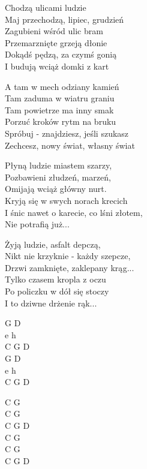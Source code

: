 
\begin{text}
    Chodzą ulicami ludzie\\
    Maj przechodzą, lipiec, grudzień\\
    Zagubieni wśród ulic bram\\
    Przemarznięte grzeją dłonie\\
    Dokądś pędzą, za czymś gonią\\
    I budują wciąż domki z kart

    \vin A tam w mech odziany kamień\\
    \vin Tam zaduma w wiatru graniu\\
    \vin Tam powietrze ma inny smak\\
    \vin Porzuć kroków rytm na bruku\\
    \vin Spróbuj - znajdziesz, jeśli szukasz\\
    \vin Zechcesz, nowy świat, własny świat

    Płyną ludzie miastem szarzy,\\
    Pozbawieni złudzeń, marzeń,\\
    Omijają wciąż główny nurt.\\
    Kryją się w swych norach krecich\\
    I śnic nawet o karecie, co lśni złotem,\\
    Nie potrafią już...

    Żyją ludzie, asfalt depczą,\\
    Nikt nie krzyknie - każdy szepcze,\\
    Drzwi zamknięte, zaklepany krąg...\\
    Tylko czasem kropla z oczu\\
    Po policzku w dół się stoczy\\
    I to dziwne drżenie rąk...
\end{text}
\begin{chord}
    G D\\
    e h\\
    C G D\\
    G D\\
    e h\\
    C G D

    C G\\
    C G\\
    C G D\\
    C G\\
    C G\\
    C G D
\end{chord}